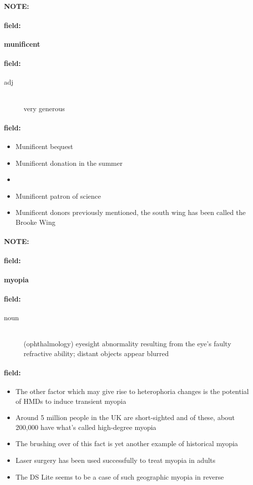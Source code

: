 \documentclass[12pt]{article}
\newenvironment{note}{\paragraph{NOTE:}}{}
\newenvironment{field}{\paragraph{field:}}{}
\begin{document}
\begin{note}
\begin{field}
\textbf{\large munificent}
\end{field}


\begin{field}
\begin{description}
\item[adj] \hfill \\ 
very generous

\end{description}
\end{field}

\begin{field}
\begin{itemize}
\item Munificent bequest
\item Munificent donation in the summer
\item 
\item Munificent patron of science
\item Munificent donors previously mentioned, the south wing has been called the Brooke Wing
\end{itemize}
\end{field}
\end{note}
\begin{note}
\begin{field}
\textbf{\large myopia}
\end{field}


\begin{field}
\begin{description}
\item[noun] \hfill \\ 
(ophthalmology) eyesight abnormality resulting from the eye's faulty refractive ability; distant objects appear blurred

\end{description}
\end{field}

\begin{field}
\begin{itemize}
\item The other factor which may give rise to heterophoria changes is the potential of HMDs to induce transient myopia
\item Around 5 million people in the UK are short-sighted and of these, about 200,000 have what's called high-degree myopia
\item The brushing over of this fact is yet another example of historical myopia
\item Laser surgery has been used successfully to treat myopia in adults
\item The DS Lite seems to be a case of such geographic myopia in reverse
\end{itemize}
\end{field}
\end{note}
\end{document}
